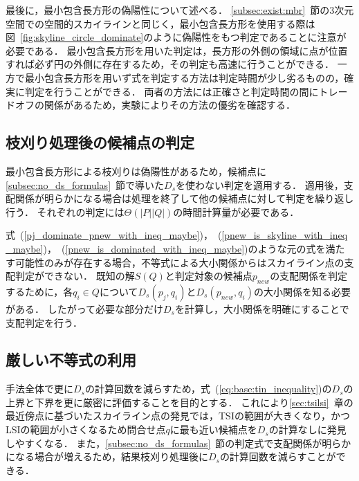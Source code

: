 \documentclass{fit}
\theoremstyle{definition}
\newcommand{\Sec}[1]{#1~章}
\newcommand{\Subsec}[1]{#1~節}
\newcommand{\Fig}[1]{図~#1}
\newcommand{\Eq}[1]{式~(#1)}
\begin{document}
最後に，最小包含長方形の偽陽性について述べる．
\Subsec{\ref{subsec:exist:mbr}}の3次元空間での空間的スカイラインと同じく，最小包含長方形を使用する際は\Fig{\ref{fig:skyline_circle_dominate}}のように偽陽性をもつ判定であることに注意が必要である．
最小包含長方形を用いた判定は，長方形の外側の領域に点が位置すれば必ず円の外側に存在するため，その判定も高速に行うことができる．
一方で最小包含長方形を用いず式を判定する方法は判定時間が少し劣るものの，確実に判定を行うことができる．
両者の方法には正確さと判定時間の間にトレードオフの関係があるため，実験によりその方法の優劣を確認する．


\subsection{枝刈り処理後の候補点の判定}\label{subsec:after:mbr}
最小包含長方形による枝刈りは偽陽性があるため，候補点に\Subsec{\ref{subsec:no_ds_formulas}}で導いた$D_s$を使わない判定を適用する．
適用後，支配関係が明らかになる場合は処理を終了して他の候補点に対して判定を繰り返し行う．
それぞれの判定には$\Theta (|P||Q|)$の時間計算量が必要である．

式~(\ref{pj_dominate_pnew_with_ineq_maybe})，~(\ref{pnew_is_skyline_with_ineq_maybe})，~(\ref{pnew_is_dominated_with_ineq_maybe})のような元の式を満たす可能性のみが存在する場合，不等式による大小関係からはスカイライン点の支配判定ができない．
既知の解$S(Q)$と判定対象の候補点$p_{new}$の支配関係を判定するために，各$q_i \in Q$について$D_s(p_j, q_i)$と$D_s(p_{new}, q_i)$の大小関係を知る必要がある．
したがって必要な部分だけ$D_s$を計算し，大小関係を明確にすることで支配判定を行う．

\subsection{厳しい不等式の利用}
手法全体で更に$D_s$の計算回数を減らすため，\Eq{\ref{eq:base:tin_inequality}}の$D_s$の上界と下界を更に厳密に評価することを目的とする．
これにより\Sec{\ref{sec:tsilsi}}の最近傍点に基づいたスカイライン点の発見では，TSIの範囲が大きくなり，かつLSIの範囲が小さくなるため問合せ点$q$に最も近い候補点を$D_s$の計算なしに発見しやすくなる．
また，\Subsec{\ref{subsec:no_ds_formulas}}の判定式で支配関係が明らかになる場合が増えるため，結果枝刈り処理後に$D_s$の計算回数を減らすことができる．
\end{document}

